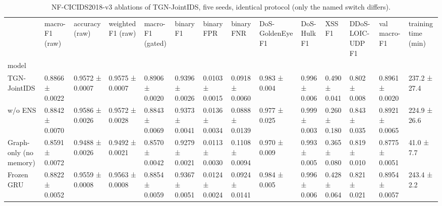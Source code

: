 \begin{table}
\caption{NF-CICIDS2018-v3 ablations of TGN-JointIDS, five seeds, identical protocol (only the named switch differs).}
\label{tab:table7_ablations}
\begin{tabular}{llllllllllllll}
\toprule
 & macro-F1 (raw) & accuracy (raw) & weighted F1 (raw) & macro-F1 (gated) & binary F1 & binary FPR & binary FNR & DoS-GoldenEye F1 & DoS-Hulk F1 & XSS F1 & DDoS-LOIC-UDP F1 & val macro-F1 & training time (min) \\
model &  &  &  &  &  &  &  &  &  &  &  &  &  \\
\midrule
TGN-JointIDS & 0.8866 ± 0.0022 & 0.9572 ± 0.0007 & 0.9575 ± 0.0007 & 0.8906 ± 0.0020 & 0.9396 ± 0.0026 & 0.0103 ± 0.0015 & 0.0918 ± 0.0060 & 0.983 ± 0.004 & 0.996 ± 0.006 & 0.490 ± 0.041 & 0.802 ± 0.008 & 0.8961 ± 0.0020 & 237.2 ± 27.4 \\
w/o ENS & 0.8842 ± 0.0070 & 0.9586 ± 0.0026 & 0.9572 ± 0.0028 & 0.8843 ± 0.0069 & 0.9373 ± 0.0041 & 0.0136 ± 0.0034 & 0.0888 ± 0.0139 & 0.977 ± 0.025 & 0.999 ± 0.003 & 0.260 ± 0.180 & 0.843 ± 0.035 & 0.8921 ± 0.0065 & 224.9 ± 26.6 \\
Graph-only (no memory) & 0.8591 ± 0.0072 & 0.9488 ± 0.0026 & 0.9492 ± 0.0021 & 0.8570 ± 0.0042 & 0.9279 ± 0.0021 & 0.0113 ± 0.0030 & 0.1108 ± 0.0094 & 0.970 ± 0.009 & 0.993 ± 0.005 & 0.365 ± 0.080 & 0.819 ± 0.010 & 0.8775 ± 0.0051 & 41.0 ± 7.7 \\
Frozen GRU & 0.8822 ± 0.0052 & 0.9559 ± 0.0008 & 0.9563 ± 0.0008 & 0.8854 ± 0.0059 & 0.9367 ± 0.0051 & 0.0124 ± 0.0024 & 0.0924 ± 0.0141 & 0.984 ± 0.005 & 0.996 ± 0.006 & 0.428 ± 0.064 & 0.821 ± 0.021 & 0.8954 ± 0.0057 & 243.4 ± 2.2 \\
\bottomrule
\end{tabular}
\end{table}
